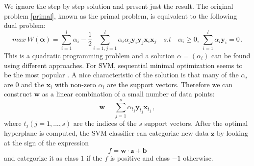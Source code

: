 \documentclass[a4paper,11pt,oneside]{article}
\begin{document}
We ignore the step by step solution and present just the result. The original problem \ref{primal}, known as the primal problem,
is equivalent to the following dual problem:
\begin{equation}
  max \ W(\mathbf{\alpha}) = \sum_{i=1}^l \alpha_i - \frac{1}{2} \sum_{i=1,j=1}^l \alpha_i \alpha_j \mathbf{y}_i\mathbf{y}_j\mathbf{x}_i\mathbf{x}_j
  \quad s.t \quad \alpha_i \geq 0,\ \sum_{i=1}^l \alpha_i\mathbf{y}_i = 0\,.
\end{equation}
This is a quadratic programming problem and a solution $\alpha=(\alpha_i)$ can be found using different approaches.
For SVM, sequential minimal optimization seems to be the most popular \cite{law2006simple}. A nice characteristic 
of the solution is that many of the $\alpha_i$ are $0$ and the $\mathbf{x}_i$ with non-zero $\alpha_i$ are the support 
vectors. Therefore we can construct $\mathbf{w}$ as a linear combination of a small number of data points:
\begin{equation}\label{svm4}
  \mathbf{w} = \sum_{j=1}^s \alpha_{t_j}\mathbf{y}_{t_j}\mathbf{x}_{t_j}\,,
\end{equation}
where $t_j(j=1,...,s)$ are the indices of the $s$ support vectors.
After the optimal hyperplane is computed, the SVM classifier can categorize new data $\mathbf{z}$ by looking at the sign of the expression
\begin{equation}
  f = \mathbf{w}\cdot\mathbf{z}+\mathbf{b}
\end{equation} and categorize it as class $1$ if the $f$ is positive and class $-1$ otherwise.
\end{document}
